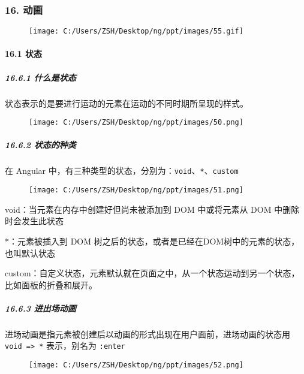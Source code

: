 \documentclass[
]{article}
\begin{document}
\hypertarget{16-ux52a8ux753b}{%
\subsubsection{16. 动画}\label{16-ux52a8ux753b}}

\begin{figure}
\centering
\texttt{[image: C:/Users/ZSH/Desktop/ng/ppt/images/55.gif]}
\caption{}
\end{figure}

\hypertarget{161-ux72b6ux6001}{%
\paragraph{16.1 状态}\label{161-ux72b6ux6001}}

\hypertarget{1661-ux4ec0ux4e48ux662fux72b6ux6001}{%
\subparagraph{16.6.1
什么是状态}\label{1661-ux4ec0ux4e48ux662fux72b6ux6001}}

状态表示的是要进行运动的元素在运动的不同时期所呈现的样式。

\begin{figure}
\centering
\texttt{[image: C:/Users/ZSH/Desktop/ng/ppt/images/50.png]}
\caption{}
\end{figure}

\hypertarget{1662-ux72b6ux6001ux7684ux79cdux7c7b}{%
\subparagraph{16.6.2
状态的种类}\label{1662-ux72b6ux6001ux7684ux79cdux7c7b}}

在 Angular
中，有三种类型的状态，分别为：\texttt{void}、\texttt{*}、\texttt{custom}

\begin{figure}
\centering
\texttt{[image: C:/Users/ZSH/Desktop/ng/ppt/images/51.png]}
\caption{}
\end{figure}

void：当元素在内存中创建好但尚未被添加到 DOM 中或将元素从 DOM
中删除时会发生此状态

*：元素被插入到 DOM
树之后的状态，或者是已经在DOM树中的元素的状态，也叫默认状态

custom：自定义状态，元素默认就在页面之中，从一个状态运动到另一个状态，比如面板的折叠和展开。

\hypertarget{1663-ux8fdbux51faux573aux52a8ux753b}{%
\subparagraph{16.6.3
进出场动画}\label{1663-ux8fdbux51faux573aux52a8ux753b}}

进场动画是指元素被创建后以动画的形式出现在用户面前，进场动画的状态用
\texttt{void\ =\textgreater{}\ *} 表示，别名为 \texttt{:enter}

\begin{figure}
\centering
\texttt{[image: C:/Users/ZSH/Desktop/ng/ppt/images/52.png]}
\caption{}
\end{figure}
\end{document}
